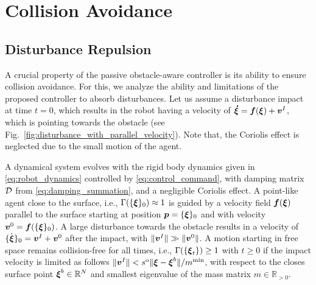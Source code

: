\section{Collision Avoidance} \label{sec:collision_avoidance}

\subsection{Disturbance Repulsion}
A crucial property of the passive obstacle-aware controller is its ability to ensure collision avoidance. For this, we analyze the ability and limitations of the proposed controller to absorb disturbances.
Let us assume a disturbance impact at time $t=0$, which results in the robot having a velocity of $\boldsymbol{\dot \xi} = \boldsymbol{f}(\boldsymbol{\xi}) + \boldsymbol{v}^I$, which is pointing towards the obstacle (see Fig.~\ref{fig:disturbance_with_parallel_velocity}). 
Note that, the Coriolis effect is neglected due to the small motion of the agent.

\begin{lemma}
	A dynamical system evolves with the rigid body dynamics given in \eqref{eq:robot_dynamics} controlled by \eqref{eq:control_command}, with damping matrix $\mathcal{D}$ from \eqref{eq:damping_summation}, and a negligible Coriolis effect.
    A point-like agent  close to the surface, i.e., $\Gamma( \{ \boldsymbol{\xi} \}_0) \approx 1$ is guided by a velocity field $\boldsymbol{f}(\boldsymbol{\xi})$ parallel to the surface starting at position $\boldsymbol{p} = \{{\boldsymbol{\xi}}\}_0$ and with velocity $\boldsymbol{v}^0= \boldsymbol{f}(\{{\boldsymbol{\xi}}\}_0)$.
    A large disturbance towards the obstacle results in a velocity of $\{\dot{\boldsymbol{\xi}}\}_0 = \boldsymbol{v}^I +  \boldsymbol{v}^0$ after the impact, with $\| \boldsymbol{v}^I \| \gg \| \boldsymbol{v}^0 \|$.
	A motion starting in free space remains collision-free for all times, i.e., $\Gamma( \{\boldsymbol{\xi}_t\}) \geq 1$ with $t \geq 0$ if the impact velocity is limited as follows $\| \boldsymbol{v}^I\| < s^{\mathrm{o}} \| \boldsymbol{\xi} - \boldsymbol{\xi}^b \| / m^{\mathrm{min}}$, with respect to the closes surface point $\boldsymbol{\xi}^b \in \mathbb{R}^N$ and smallest eigenvalue of the mass matrix $m \in \mathbb{R}_{>0}$.
\end{lemma}


